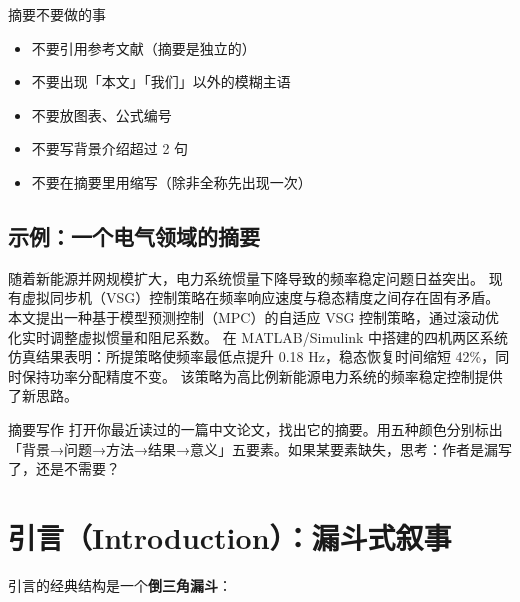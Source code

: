 \documentclass[12pt,a4paper]{ctexart}
\begin{document}
\begin{writingtip}{摘要不要做的事}
    \begin{itemize}
        \item 不要引用参考文献（摘要是独立的）
        \item 不要出现「本文」「我们」以外的模糊主语
        \item 不要放图表、公式编号
        \item 不要写背景介绍超过 2 句
        \item 不要在摘要里用缩写（除非全称先出现一次）
    \end{itemize}
\end{writingtip}

\subsection*{示例：一个电气领域的摘要}

\begin{tcolorbox}[colback=gray!5!white, colframe=gray!50!black, title=摘要示例]
随着新能源并网规模扩大，电力系统惯量下降导致的频率稳定问题日益突出。
现有虚拟同步机（VSG）控制策略在频率响应速度与稳态精度之间存在固有矛盾。
本文提出一种基于模型预测控制（MPC）的自适应 VSG 控制策略，通过滚动优化实时调整虚拟惯量和阻尼系数。
在 MATLAB/Simulink 中搭建的四机两区系统仿真结果表明：所提策略使频率最低点提升 0.18 Hz，稳态恢复时间缩短 42\%，同时保持功率分配精度不变。
该策略为高比例新能源电力系统的频率稳定控制提供了新思路。
\end{tcolorbox}

\begin{exercise}{摘要写作}
    打开你最近读过的一篇中文论文，找出它的摘要。用五种颜色分别标出「背景→问题→方法→结果→意义」五要素。如果某要素缺失，思考：作者是漏写了，还是不需要？
\end{exercise}


\section{引言（Introduction）：漏斗式叙事}

引言的经典结构是一个\textbf{倒三角漏斗}：

\begin{center}
\end{center}
\end{document}
